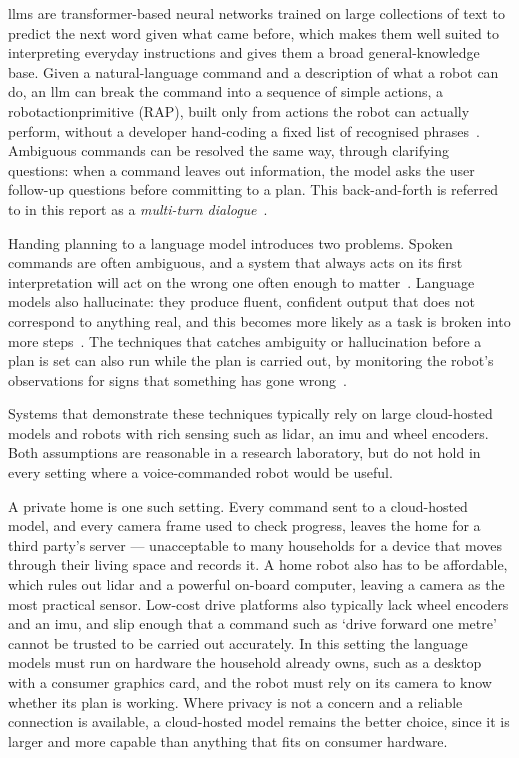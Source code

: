 \Acp{llm} are transformer-based neural networks trained on large collections of text to predict
the next word given what came before, which makes them well suited to interpreting everyday
instructions and gives them a broad general-knowledge base. Given a natural-language command
and a description of what a robot can do, an \ac{llm} can break the command into a sequence of
simple actions, a \ac{robotactionprimitive} (RAP), built only from actions the robot can
actually perform, without a developer hand-coding a fixed list of recognised
phrases~\cite{ahn2022saycan}. Ambiguous commands can be resolved the same way, through
clarifying questions: when a command leaves out information, the model asks the user
follow-up questions before committing to a plan. This back-and-forth is referred to in this
report as a \emph{multi-turn dialogue}~\cite{hori2025longhorizon}.

Handing planning to a language model introduces two problems. Spoken commands are often
ambiguous, and a system that always acts on its first interpretation will act on the wrong one
often enough to matter~\cite{ren2023knowno}. Language models also hallucinate: they produce
fluent, confident output that does not correspond to anything real, and this becomes more
likely as a task is broken into more steps~\cite{liang2024introspective}. The techniques that
catches ambiguity or hallucination before a plan is set can also run while the plan is carried
out, by monitoring the robot's observations for signs that something has gone
wrong~\cite{sinha2024aesop, elhafsi2023semantic}.

Systems that demonstrate these techniques typically rely on large cloud-hosted models and
robots with rich sensing such as \acs{lidar}, an \ac{imu} and wheel encoders. Both assumptions
are reasonable in a research laboratory, but do not hold in every setting where a
voice-commanded robot would be useful.

A private home is one such setting. Every command sent to a cloud-hosted model, and every
camera frame used to check progress, leaves the home for a third party's server — unacceptable
to many households for a device that moves through their living space and records it. A home
robot also has to be affordable, which rules out \acs{lidar} and a powerful on-board computer,
leaving a camera as the most practical sensor. Low-cost drive platforms also typically lack
wheel encoders and an \ac{imu}, and slip enough that a command such as `drive forward one
metre' cannot be trusted to be carried out accurately. In this setting the language models
must run on hardware the household already owns, such as a desktop with a consumer graphics
card, and the robot must rely on its camera to know whether its plan is working. Where privacy
is not a concern and a reliable connection is available, a cloud-hosted model remains the
better choice, since it is larger and more capable than anything that fits on consumer
hardware.

